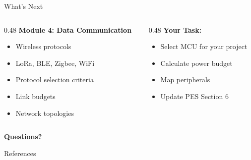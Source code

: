 \documentclass[aspectratio=169,11pt]{beamer}
\begin{document}
\begin{frame}{What's Next}
    \begin{columns}[T]
        \begin{column}{0.48\textwidth}
            \textbf{Module 4: Data Communication}
            \begin{itemize}
                \item Wireless protocols
                \item LoRa, BLE, Zigbee, WiFi
                \item Protocol selection criteria
                \item Link budgets
                \item Network topologies
            \end{itemize}
        \end{column}
        \begin{column}{0.48\textwidth}
            \textbf{Your Task:}
            \begin{itemize}
                \item Select MCU for your project
                \item Calculate power budget
                \item Map peripherals
                \item Update PES Section 6
            \end{itemize}
        \end{column}
    \end{columns}
    
    \vspace{0.5cm}
    \begin{center}
        \Large
        \textbf{Questions?}
    \end{center}
\end{frame}


\begin{frame}[allowframebreaks]{References}
    \printbibliography
\end{frame}
\end{document}

